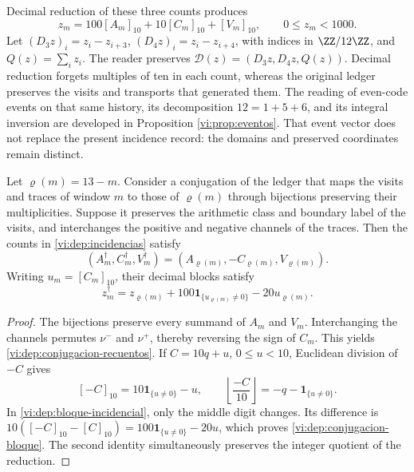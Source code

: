 Decimal reduction of these three counts produces
\begin{equation}
 z_m=100[A_m]_{10}+10[C_m]_{10}+[V_m]_{10},
 \qquad 0\le z_m<1000.
 \label{vi:dep:bloque-incidencial}
\end{equation}
Let \((D_3z)_i=z_i-z_{i+3}\),
\((D_4z)_i=z_i-z_{i+4}\), with indices in \(\ZZ/12\ZZ\), and
\(Q(z)=\sum_i z_i\). The reader preserves
\(\mathcal D(z)=(D_3z,D_4z,Q(z))\). Decimal reduction forgets
multiples of ten in each count, whereas the original ledger preserves
the visits and transports that generated them.
The reading of even-code events on that same history,
its decomposition \(12=1+5+6\), and its integral inversion are
developed in Proposition \ref{vi:prop:eventos}. That event
vector does not replace the present incidence record:
the domains and preserved coordinates remain distinct.

\begin{proposition}
\label{vi:dep:conjugacion-incidencial}
Let \(\varrho(m)=13-m\). Consider a conjugation of the ledger
that maps the visits and traces of window \(m\) to those of
\(\varrho(m)\) through bijections preserving their multiplicities.
Suppose it preserves the arithmetic class and boundary label
of the visits, and interchanges the positive and negative channels of the
traces. Then the counts in \eqref{vi:dep:incidencias} satisfy
\begin{equation}
 (A_m^\dagger,C_m^\dagger,V_m^\dagger)
 =(A_{\varrho(m)},-C_{\varrho(m)},V_{\varrho(m)}).
 \label{vi:dep:conjugacion-recuentos}
\end{equation}
Writing \(u_m=[C_m]_{10}\), their decimal blocks satisfy
\begin{equation}
 z_m^\dagger=z_{\varrho(m)}
       +100\mathbf1_{\{u_{\varrho(m)}\ne0\}}-20u_{\varrho(m)}.
 \label{vi:dep:conjugacion-bloque}
\end{equation}
\end{proposition}
\begin{proof}
The bijections preserve every summand of \(A_m\) and \(V_m\).
Interchanging the channels permutes \(\nu^-\) and \(\nu^+\),
thereby reversing the sign of \(C_m\). This yields
\eqref{vi:dep:conjugacion-recuentos}. If \(C=10q+u\),
\(0\le u<10\), Euclidean division of \(-C\) gives
\[
 [-C]_{10}=10\mathbf1_{\{u\ne0\}}-u,
 \qquad
 \left\lfloor\frac{-C}{10}\right\rfloor
 =-q-\mathbf1_{\{u\ne0\}}.
\]
In \eqref{vi:dep:bloque-incidencial}, only the middle digit
changes. Its difference is
\(10([-C]_{10}-[C]_{10})=100\mathbf1_{\{u\ne0\}}-20u\),
which proves \eqref{vi:dep:conjugacion-bloque}. The second
identity simultaneously preserves the integer quotient of the reduction.
\end{proof}

